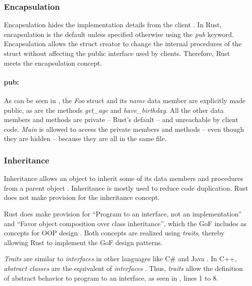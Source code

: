\subsubsection{Encapsulation}
Encapsulation hides the implementation details from the client \cite{klabnik_2019_01,meyer_97_01,savitch_15_01}.
In Rust, encapsulation is the default unless specified otherwise using the \textit{pub} keyword.
Encapsulation allows the struct creator to change the internal procedures of the struct without affecting the public interface used by clients.
Therefore, Rust meets the encapsulation concept.

\paragraph{pub:}
As can be seen in , the \textit{Foo} struct and its \textit{name} data member are explicitly made public, as are the methods \textit{get\_age} and \textit{have\_birthday}.
All the other data members and methods are private -- Rust's default -- and unreachable by client code.
\textit{Main} is allowed to access the private members and methods -- even though they are hidden -- because they are all in the same file.

\subsubsection{Inheritance}
Inheritance allows an object to inherit some of its data members and procedures from a parent object \cite{meyer_97_01,stefik_85_01,gamma_94_01,savitch_15_01}.
Inheritance is mostly used to reduce code duplication.
Rust does not make provision for the inheritance concept.

Rust does make provision for ``Program to an interface, not an implementation'' and ``Favor object composition over class inheritance'', which the GoF includes as concepts for OOP design \cite{gamma_94_01}.
Both concepts are realized using \textit{traits}, thereby allowing Rust to implement the GoF design patterns.

\textit{Traits} are similar \cite{klabnik_2019_01} to \textit{interfaces} in other languages like C\# \cite{robinson_04_01} and Java \cite{gosling_96_01}.
In C++, \textit{abstract classes} are the equivalent of \textit{interfaces} \cite{malik_09_01,stroustrup_13_01,alexandrescu_01_01}.
Thus, \textit{traits} allow the definition of abstract behavior to program to an interface, as seen in , lines 1 to 8.

